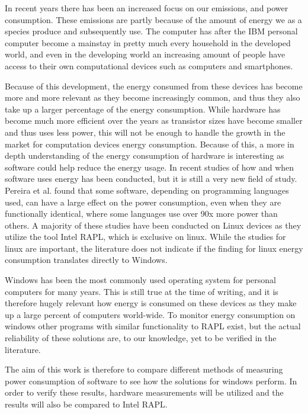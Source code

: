 In recent years there has been an increased focus on our emissions, and power consumption. These emissions are partly because of the amount of energy we as a species produce and subsequently use. 
The computer has after the IBM personal computer become a mainstay in pretty much every household in the developed world, and even in the developing world an increasing amount of people have access to their own computational devices such as computers and smartphones\cite{DevelopedWorldPC}. 

Because of this development, the energy consumed from these devices has become more and more relevant as they become increasingly common, and thus they also take up a larger percentage of the energy consumption. 
While hardware has become much more efficient over the years as transistor sizes have become smaller and thus uses less power, this will not be enough to handle the growth in the market for computation devices energy consumption. Because of this, a more in depth understanding of the energy consumption of hardware is interesting as software could help reduce the energy usage\cite{somavat2011energy}. 
In recent studies of how and when software uses energy has been conducted, but it is still a very new field of study. Pereira et al. found that some software, depending on programming languages used, can have a large effect on the power consumption, even when they are functionally identical, where some languages use over 90x more power than others.
A majority of these studies have been conducted on Linux devices as they utilize the tool Intel RAPL, which is exclusive on linux. While the studies for linux are important, the literature does not indicate if the finding for linux energy consumption translates directly to Windows\cite{Pereira2017}. 

Windows has been the most commonly used operating system for personal computers for many years. This is still true at the time of writing, and it is therefore hugely relevant how energy is consumed on these devices as they make up a large percent of computers world-wide\cite{OSShare}. To monitor energy consumption on windows other programs with similar functionality to RAPL exist, but the actual reliability of these solutions are, to our knowledge, yet to be verified in the literature.

The aim of this work is therefore to compare different methods of measuring power consumption of software to see how the solutions for windows perform. 
In order to verify these results, hardware measurements will be utilized and the results will also be compared to Intel RAPL.

